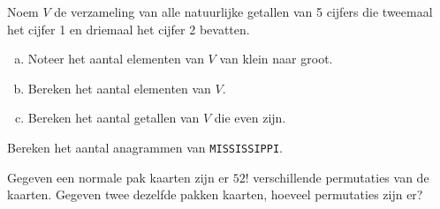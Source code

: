 \documentclass[12pt,a4,twoside]{article}
\begin{document}
\begin{oefening}
Noem $V$ de verzameling van alle natuurlijke getallen van 5 cijfers die tweemaal het cijfer 1 en driemaal het cijfer 2 bevatten.
\begin{enumerate}[(a)]
  \item Noteer het aantal elementen van $V$ van klein naar groot.
  \item Bereken het aantal elementen van $V$.
  \item Bereken het aantal getallen van $V$ die even zijn.
\end{enumerate}
\end{oefening}

\begin{oefening}
Bereken het aantal anagrammen van \texttt{MISSISSIPPI}.
\end{oefening}

\begin{oefening} %
Gegeven een normale pak kaarten zijn er $52!$ verschillende permutaties van de kaarten. Gegeven twee dezelfde pakken kaarten, hoeveel permutaties zijn er?
\end{oefening}
\end{document}
